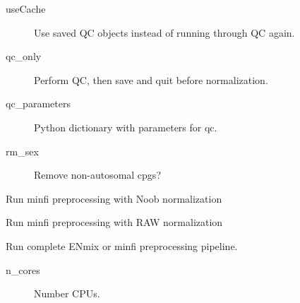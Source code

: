 \documentclass[letterpaper,10pt,english]{sphinxmanual}
\begin{document}
\begin{fulllineitems}
\begin{fulllineitems}
\begin{description}
\item[{useCache}] \leavevmode
Use saved QC objects instead of running through QC again.

\item[{qc\_only}] \leavevmode
Perform QC, then save and quit before normalization.

\item[{qc\_parameters}] \leavevmode
Python dictionary with parameters for qc.

\item[{rm\_sex}] \leavevmode
Remove non-autosomal cpgs?

\end{description}

\end{fulllineitems}


\begin{fulllineitems}
\label{\detokenize{index:pymethylprocess.PreProcessDataTypes.PreProcessIDAT.preprocessNoob}}
Run minfi preprocessing with Noob normalization

\end{fulllineitems}


\begin{fulllineitems}
\label{\detokenize{index:pymethylprocess.PreProcessDataTypes.PreProcessIDAT.preprocessRAW}}
Run minfi preprocessing with RAW normalization

\end{fulllineitems}


\begin{fulllineitems}
\label{\detokenize{index:pymethylprocess.PreProcessDataTypes.PreProcessIDAT.preprocess_enmix_pipeline}}
Run complete ENmix or minfi preprocessing pipeline.
\begin{description}
\item[{n\_cores}] \leavevmode
Number CPUs.


\end{description}
\end{fulllineitems}
\end{fulllineitems}
\end{document}
